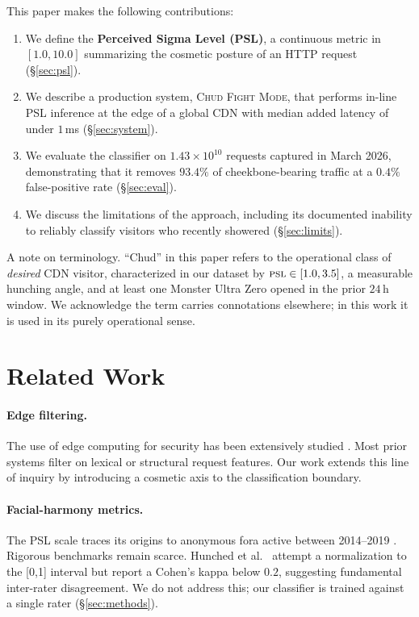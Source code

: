 \documentclass[10pt,twocolumn,letterpaper]{article}
\begin{document}
This paper makes the following contributions:
\begin{enumerate}[leftmargin=*,nosep]
  \item We define the \textbf{Perceived Sigma Level (PSL)}, a continuous
    metric in $[1.0, 10.0]$ summarizing the cosmetic posture of an HTTP
    request (\S\ref{sec:psl}).
  \item We describe a production system, \textsc{Chud Fight Mode}, that
    performs in-line PSL inference at the edge of a global CDN with median
    added latency of under $1$\,ms (\S\ref{sec:system}).
  \item We evaluate the classifier on $1.43 \times 10^{10}$ requests
    captured in March 2026, demonstrating that it removes $93.4\%$ of
    cheekbone-bearing traffic at a $0.4\%$ false-positive rate
    (\S\ref{sec:eval}).
  \item We discuss the limitations of the approach, including its
    documented inability to reliably classify visitors who recently
    showered (\S\ref{sec:limits}).
\end{enumerate}

A note on terminology. ``Chud'' in this paper refers to the operational
class of \emph{desired} CDN visitor, characterized in our dataset by
$\textsc{psl} \in [1.0, 3.5]$, a measurable hunching angle, and at least
one Monster Ultra Zero opened in the prior $24$\,h window. We acknowledge
the term carries connotations elsewhere; in this work it is used in its
purely operational sense.

\section{Related Work}
\label{sec:related}

\paragraph{Edge filtering.}
The use of edge computing for security has been extensively studied
\cite{cflare2017workers, fastlyedge2019, akamai2020origin}. Most prior
systems filter on lexical or structural request features. Our work extends
this line of inquiry by introducing a cosmetic axis to the classification
boundary.

\paragraph{Facial-harmony metrics.}
The PSL scale traces its origins to anonymous fora active between
2014--2019 \cite{anon2018psl, anon2019harmony}. Rigorous benchmarks remain
scarce. Hunched et al.~\cite{hunched2022bench} attempt a normalization
to the [0,1] interval but report a Cohen's kappa below $0.2$, suggesting
fundamental inter-rater disagreement. We do not address this; our
classifier is trained against a single rater (\S\ref{sec:methods}).
\end{document}
